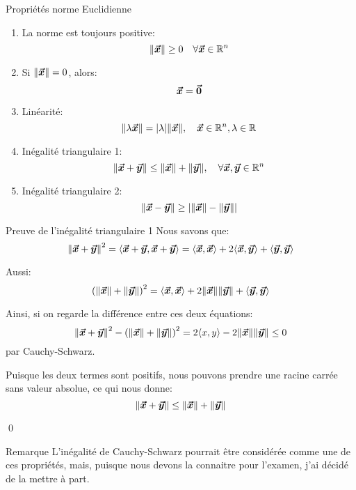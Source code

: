 \documentclass[a4paper]{article}
\begin{document}
\begin{parag}{Propriétés norme Euclidienne}
    \begin{enumerate}[left=0pt]
        \item La norme est toujours positive:
        \[\left\|\bvec{x}\right\| \geq 0 \mathspace \forall \bvec{x} \in \mathbb{R}^n\]

        \item Si $\left\|\bvec{x}\right\| = 0$, alors: 
        \[\bm{\protect\vec{x}} = \bm{\protect\vec{0}}\]
        
        \item Linéarité: 
        \[\left\|\lambda \bvec{x}\right\| = \left|\lambda\right| \left\|\bvec{x}\right\|, \mathspace \bvec{x} \in \mathbb{R}^n, \lambda \in \mathbb{R}\]
        
        \item Inégalité triangulaire 1: 
        \[\left\|\bvec{x} + \bvec{y}\right\| \leq \left\|\bvec{x}\right\| + \left\|\bvec{y}\right\|, \mathspace \forall \bvec{x}, \bvec{y} \in \mathbb{R}^n\]

        \item Inégalité triangulaire 2: 
        \[\left\|\bvec{x} - \bvec{y}\right\| \geq \left|\left\|\bvec{x}\right\| - \left\|\bvec{y}\right\|\right|\]
    \end{enumerate}
    
    \begin{subparag}{Preuve de l'inégalité triangulaire 1}
        Nous savons que: 
        \[\left\|\bvec{x} + \bvec{y}\right\|^2 = \left<\bvec{x} + \bvec{y}, \bvec{x} + \bvec{y}\right> = \left<\bvec{x}, \bvec{x}\right> + 2\left<\bvec{x}, \bvec{y}\right> + \left<\bvec{y}, \bvec{y}\right>\]

        Aussi:
        \[\left(\left\|\bvec{x}\right\| + \left\|\bvec{y}\right\|\right)^2 = \left<\bvec{x}, \bvec{x}\right> + 2\left\|\bvec{x}\right\|\left\|\bvec{y}\right\| + \left<\bvec{y}, \bvec{y}\right>\]

        Ainsi, si on regarde la différence entre ces deux équations: 
        \[\left\|\bvec{x} + \bvec{y}\right\|^2 - \left(\left\|\bvec{x}\right\| + \left\|\bvec{y}\right\|\right)^2 = 2\left<x, y\right> - 2\left\|\bvec{x}\right\|\left\|\bvec{y}\right\| \leq 0\]
        par Cauchy-Schwarz.

        Puisque les deux termes sont positifs, nous pouvons prendre une racine carrée sans valeur absolue, ce qui nous donne:
        \[\left\|\bvec{x} + \bvec{y}\right\| \leq \left\|\bvec{x}\right\| + \left\|\bvec{y}\right\|\]

        \qed
    \end{subparag}
    
    \begin{subparag}{Remarque}
        L'inégalité de Cauchy-Schwarz pourrait être considérée comme une de ces propriétés, mais, puisque nous devons la connaitre pour l'examen, j'ai décidé de la mettre à part.
    \end{subparag}
\end{parag}
    
\end{document}
